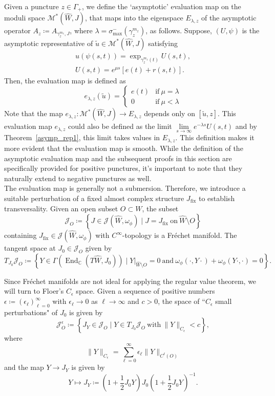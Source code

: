 \documentclass[11pt, a4paper]{amsart}
\newcommand{\cJ}{\mathcal{J}}
\newcommand{\cM}{\mathcal{M}}
\DeclareMathOperator{\End}{End}
\begin{document}
Given a puncture $z\in \Gamma_+$, we define the `asymptotic' evaluation map on the moduli space $\cM^*(\widehat{W},J)$, that maps  into the eigenspace $E_{\lambda,z}$ of the asymptotic operator $A_{z}\coloneqq A_{\gamma_z^{m_z},J}$, where  $\lambda = \sigma_{\max}^-(\gamma_z^{m_z})$, as follows.
Suppose, $(U, \psi)$ is the asymptotic representative of $\tilde{u} \in \cM^*(\widehat{W},J)$ satisfying
\begin{gather*}
u(\psi(s, t)) = \exp_{\gamma_z^{m_z}(t)} U(s,t),\\
U(s, t) = e^{\mu s} [e(t) + r (s, t)].
\end{gather*}
Then, the evaluation map is defined as 
\begin{equation}\label{evaluation map definfition}
e_{\lambda,z}(\tilde{u})= \begin{cases} 
      e(t) & \mathrm{if\ } \mu=\lambda\\
      0 & \mathrm{if\ } \mu <\lambda
   \end{cases}
\end{equation}
Note that the map $e_{\lambda,z}\colon \cM^*(\widehat{W},J) \rightarrow E_{\lambda,z}$ depends only on $[\tilde{u},z]$. This evaluation map $e_{\lambda,z}$ could also be defined as the limit $\lim\limits_{s\rightarrow \infty}e^{-\lambda s} U(s,t)$ and by Theorem~\ref{asymp_rep1}, this limit takes values in $E_{\lambda,z}$. This definition makes it more evident that the evaluation map is smooth. While the definition of the asymptotic evaluation map and the subsequent proofs in this section are specifically provided for positive punctures, it's important to note that they naturally extend to negative punctures as well.\\

The evaluation map is generally not a submersion. Therefore, we introduce a suitable perturbation of a fixed almost complex structure $J_{\mathrm{fix}}$ to establish transversality. Given an open subset $O\subset W$, the subset 
$$\cJ_O\coloneqq \left\{ J \in \cJ(\widehat{W},\omega_{\phi})\mid J=J_{\mathrm{fix}} \mathrm{\ on \ } \widehat{W}\setminus O\right\}$$ 
containing $J_{\mathrm{fix}} \in \cJ(\widehat{W},\omega_{\phi})$ with $C^{\infty}$-topology is a Fr\'echet manifold. The tangent space at $J_0 \in \cJ_O$ given by
$$T_{J_0} \cJ_O\coloneqq \left\{Y \in \Gamma\left(\End_{\mathbb{C}}\left( T\widehat{W}, J_0\right)\right) \mid  Y |_{\widehat{W}\setminus O}= 0 \mathrm{\ and\ } \omega_{\phi}(\cdot, Y\cdot)+ \omega_{\phi}(Y\cdot,\cdot)=0\right\}.$$

Since Fr\'echet manifolds are not ideal for applying the regular value theorem, we will turn to Floer's $C_{\epsilon}$ space. Given a sequence of positive numbers $\epsilon\coloneqq (\epsilon_{\ell})_{\ell=0}^{\infty}$ with $\epsilon_{\ell} \rightarrow 0$ as $\ell \rightarrow \infty$ and $c>0$, the space of ``$C_{\epsilon}$ small perturbations" of $J_0$ is given by
$$\cJ_O^{\epsilon}\coloneqq \left\{ J_Y \in \cJ_O \mid Y \in T_{J_0}\cJ_O \mathrm{\ with\ } \|Y\|_{C_{\epsilon}}<c \right\},$$
where 
$$\|Y\|_{C_{\epsilon}} = \sum_{\ell=0}^{\infty} \epsilon_{\ell} \|Y\|_{C^{\ell}(O)}$$
and the map $Y\rightarrow J_Y$ is given by 
\[Y\mapsto J_Y\coloneqq \left(1+\frac{1}{2}J_0Y\right)J_0 \left(1+\frac{1}{2}J_0Y\right)^{-1}.\]
\end{document}
